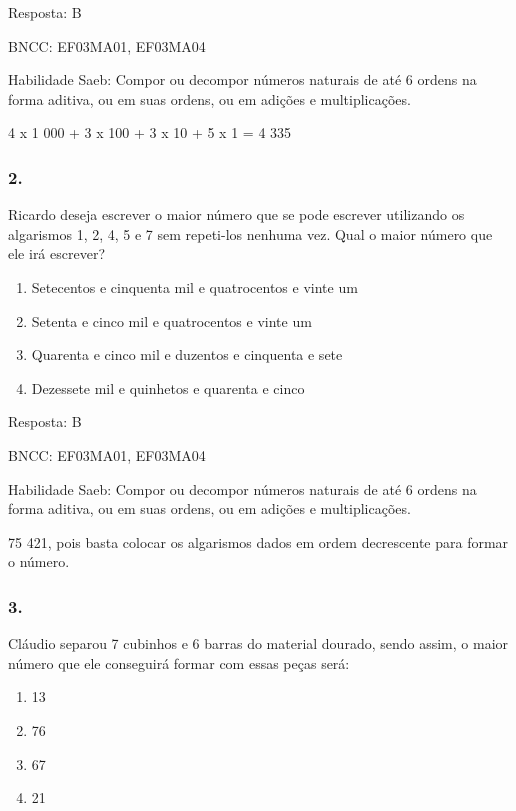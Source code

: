 Resposta: B

BNCC: EF03MA01, EF03MA04

Habilidade Saeb: Compor ou decompor números naturais de até 6 ordens na
forma aditiva, ou em suas ordens, ou em adições e multiplicações.

4 x 1 000 + 3 x 100 + 3 x 10 + 5 x 1 = 4 335

\subsubsection{2.}\label{section-157}

Ricardo deseja escrever o maior número que se pode escrever utilizando
os algarismos 1, 2, 4, 5 e 7 sem repeti-los nenhuma vez. Qual o maior
número que ele irá escrever?

\begin{enumerate}
\def\labelenumi{\alph{enumi})}
\item
  Setecentos e cinquenta mil e quatrocentos e vinte um
\item
  Setenta e cinco mil e quatrocentos e vinte um
\item
  Quarenta e cinco mil e duzentos e cinquenta e sete
\item
  Dezessete mil e quinhetos e quarenta e cinco
\end{enumerate}

Resposta: B

BNCC: EF03MA01, EF03MA04

Habilidade Saeb: Compor ou decompor números naturais de até 6 ordens na
forma aditiva, ou em suas ordens, ou em adições e multiplicações.

75 421, pois basta colocar os algarismos dados em ordem decrescente para
formar o número.

\subsubsection{3.}\label{section-158}

Cláudio separou 7 cubinhos e 6 barras do material dourado, sendo assim,
o maior número que ele conseguirá formar com essas peças será:

\begin{enumerate}
\def\labelenumi{\alph{enumi})}
\item
  13
\item
  76
\item
  67
\item
  21
\end{enumerate}

